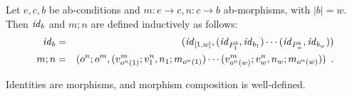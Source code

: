 \begin{definition}\label{def:ab-morphism-composition}
Let $e,c,b$ be ab-conditions and $m:e\to c,n:c\to b$ ab-morphisms, with $|b|=w$. Then $\mathit{id}_b$ and $m;n$ are defined inductively as follows:
%
\begin{eqnarray}
\mathit{id}_b & =
  & (\mathit{id}_{[1,w]},(\mathit{id}_{P^b_1},\mathit{id}_{b_1})\cdots 
                 (\mathit{id}_{P^b_w},\mathit{id}_{b_w}))
  \label{eq:id-morphism} \\
m;n & =
  & (o^n;o^m,(v^m_{o^n(1)};v^n_1,n_1;m_{o^n(1)})\cdots 
              (v^m_{o^n(w)};v^n_w,n_w;m_{o^n(w)})) \enspace.
 \label{eq:morphism composition}
\end{eqnarray}

\end{definition}
%
Identities are morphisms, and morphism composition is well-defined.

